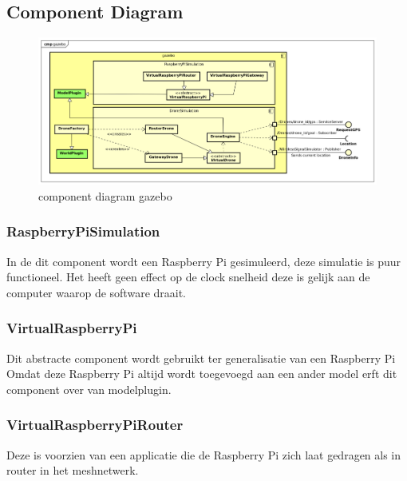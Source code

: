 \documentclass[a4paper, 11pt, oneside]{report}
\begin{document}
\subsection{Component Diagram}
\label{DetailedDesign:MeshNetwerk:ComponentDiagram}
\begin{figure}[H]
	\begin{center}\includegraphics[width=\linewidth]{Afbeeldingen/gazeboComponentDiagram.png}\end{center}
	\caption{component diagram gazebo}
	\label{fig:component:gazebo}
\end{figure}

\subsubsection{RaspberryPiSimulation}
\label{architectural:subcomponenten:RaspberryPiSimulation}
In de dit component wordt een Raspberry Pi gesimuleerd, deze simulatie is puur functioneel.
Het heeft geen effect op de clock snelheid deze is gelijk aan de computer waarop de software draait. 

\subsubsection{VirtualRaspberryPi}
\label{architectural:subcomponenten:VirtualRaspberryPi}
Dit abstracte component wordt gebruikt ter generalisatie van een Raspberry Pi
Omdat deze Raspberry Pi altijd wordt toegevoegd aan een ander model erft dit component over van modelplugin.    

\subsubsection{VirtualRaspberryPiRouter}
\label{architectural:subcomponenten:VirtualRaspberryPiRouter}
Deze  is voorzien van een applicatie die de Raspberry Pi zich laat gedragen als in router in het meshnetwerk. 
\end{document}
